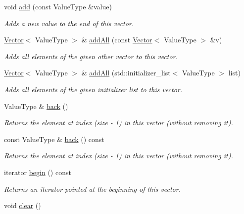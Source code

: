 \begin{DoxyCompactItemize}
void \mbox{\hyperlink{classVector_ab901606bf3a8019c986f0cf9a9f298dc}{add}} (const Value\+Type \&value)
\begin{DoxyCompactList}\small\item\em Adds a new value to the end of this vector. \end{DoxyCompactList}\item 
\mbox{\hyperlink{classVector}{Vector}}$<$ Value\+Type $>$ \& \mbox{\hyperlink{classVector_a7e05c14d67a60defeb6723b5704967a6}{add\+All}} (const \mbox{\hyperlink{classVector}{Vector}}$<$ Value\+Type $>$ \&v)
\begin{DoxyCompactList}\small\item\em Adds all elements of the given other vector to this vector. \end{DoxyCompactList}\item 
\mbox{\hyperlink{classVector}{Vector}}$<$ Value\+Type $>$ \& \mbox{\hyperlink{classVector_a36067964c5c7f8b7934682f5c3be49c6}{add\+All}} (std\+::initializer\+\_\+list$<$ Value\+Type $>$ list)
\begin{DoxyCompactList}\small\item\em Adds all elements of the given initializer list to this vector. \end{DoxyCompactList}\item 
Value\+Type \& \mbox{\hyperlink{classVector_a2bad145b40a82c36986f67610313658d}{back}} ()
\begin{DoxyCompactList}\small\item\em Returns the element at index (size -\/ 1) in this vector (without removing it). \end{DoxyCompactList}\item 
const Value\+Type \& \mbox{\hyperlink{classVector_adc761c91bdacd01bed5c96e25fd9486a}{back}} () const
\begin{DoxyCompactList}\small\item\em Returns the element at index (size -\/ 1) in this vector (without removing it). \end{DoxyCompactList}\item 
iterator \mbox{\hyperlink{classVector_a0c62c15c8ed609e7e5e9518cf5f5c712}{begin}} () const
\begin{DoxyCompactList}\small\item\em Returns an iterator pointed at the beginning of this vector. \end{DoxyCompactList}\item 
void \mbox{\hyperlink{classVector_ac8bb3912a3ce86b15842e79d0b421204}{clear}} ()

\end{DoxyCompactItemize}

